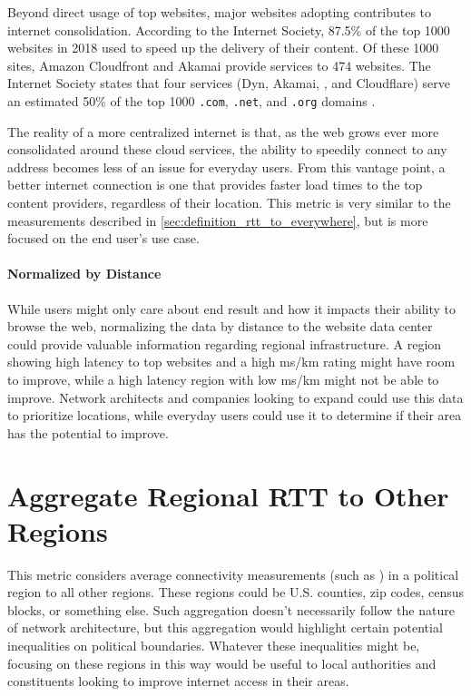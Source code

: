 Beyond direct usage of top websites, major websites adopting \cdns contributes to internet consolidation. According to the Internet Society, 87.5\% of the top 1000 websites in 2018 used \cdns to speed up the delivery of their content. Of these 1000 sites, Amazon Cloudfront and Akamai provide \cdn services to 474 websites. The Internet Society states that four services (Dyn, Akamai, \AWS, and Cloudflare) serve an estimated 50\% of the top 1000 \texttt{.com}, \texttt{.net}, and \texttt{.org} domains \cite{TheInternetSociety2019}.

The reality of a more centralized internet is that, as the web grows ever more consolidated around these cloud services, the ability to speedily connect to any \ip address becomes less of an issue for everyday users. From this vantage point, a better internet connection is one that provides faster load times to the top content providers, regardless of their location. This metric is very similar to the \rtt measurements described in \ref{sec:definition_rtt_to_everywhere}, but is more focused on the end user's use case.

\paragraph{Normalized by Distance}
While users might only care about end result and how it impacts their ability to browse the web, normalizing the data by distance to the website data center could provide valuable information regarding regional infrastructure. A region showing high latency to top websites and a high ms/km rating might have room to improve, while a high latency region with low ms/km might not be able to improve. Network architects and companies looking to expand could use this data to prioritize locations, while everyday users could use it to determine if their area has the potential to improve.

\section{Aggregate Regional RTT to Other Regions}

This metric considers average connectivity measurements (such as \rtt) in a political region to all other regions. These regions could be U.S. counties, zip codes, census blocks, or something else. Such aggregation doesn't necessarily follow the nature of network architecture, but this aggregation would highlight certain potential inequalities on political boundaries. Whatever these inequalities might be, focusing on these regions in this way would be useful to local authorities and constituents looking to improve internet access in their areas.

